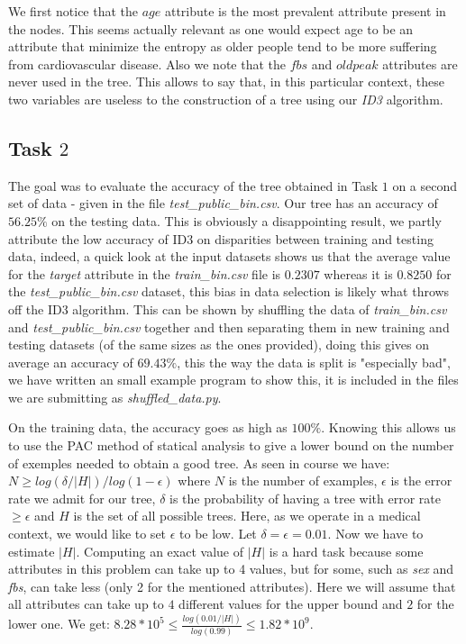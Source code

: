 \documentclass[8pt]{extarticle}
\begin{document}
	We first notice that the $age$ attribute is the most prevalent attribute present in the nodes. This seems actually relevant as one would expect age to be an attribute that minimize the entropy as older people tend to be more suffering from cardiovascular disease. Also we note that the $fbs$ and $oldpeak$ attributes are never used in the tree. This allows to say that, in this particular context, these two variables are useless to the construction of a tree using our \emph{ID3} algorithm.
		
		
\subsection{Task $2$}
	The goal was to evaluate the accuracy of the tree obtained in Task $1$ on a second set of data - given in the file \emph{test\_public\_bin.csv}.
	Our tree has an accuracy of $56.25\%$ on the testing data. This is obviously a disappointing result, we partly attribute the low accuracy of ID3 on disparities between training and testing data, indeed, a quick look at the input datasets shows us that the average value for the \emph{target} attribute in the \emph{train\_bin.csv} file is $0.2307$ whereas it is $0.8250$ for the \emph{test\_public\_bin.csv} dataset, this bias in data selection is likely what throws off the ID3 algorithm. This can be shown by shuffling the data of \emph{train\_bin.csv} and \emph{test\_public\_bin.csv} together and then separating them in new training and testing datasets (of the same sizes as the ones provided), doing this gives on average an accuracy of $69.43\%$, this the way the data is split is "especially bad", we have written an small example program to show this, it is included in the files we are submitting as \emph{shuffled\_data.py}.
	
	On the training data, the accuracy goes as high as $100\%$. Knowing this allows us to use the PAC method of statical analysis to give a lower bound on the number of exemples needed to obtain a good tree. As seen in course we have:
	$N\geq{log(\delta/|H|)}/{log(1-\epsilon)}$
where $N$ is the number of examples, $\epsilon$ is the error rate we admit for our tree, $\delta$ is the probability of having a tree with error rate $\geq\epsilon$ and $H$ is the set of all possible trees. Here, as we operate in a medical context, we would like to set $\epsilon$  to be low. Let $\delta=\epsilon= 0.01$. Now we have to estimate $|H|$. Computing an exact value of $|H|$ is a hard task because some attributes in this problem can take up to 4 values, but for some, such as \emph{sex} and \emph{fbs}, can take less (only 2 for the mentioned attributes). Here we will assume that all attributes can take up to $4$ different values for the upper bound and $2$ for the lower one. We get: $8.28*10^5\leq\frac{log(0.01/|H|)}{log(0.99)}\leq1.82*10^9.$ \\
	
\end{document}

